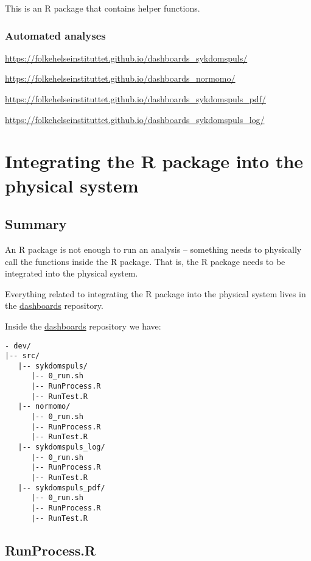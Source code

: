 \documentclass[12pt,]{article}
\begin{document}
This is an R package that contains helper functions.

\subsubsection{Automated analyses}\label{automated-analyses}

\url{https://folkehelseinstituttet.github.io/dashboards_sykdomspuls/}

\url{https://folkehelseinstituttet.github.io/dashboards_normomo/}

\url{https://folkehelseinstituttet.github.io/dashboards_sykdomspuls_pdf/}

\url{https://folkehelseinstituttet.github.io/dashboards_sykdomspuls_log/}

\section{Integrating the R package into the physical
system}\label{integrating-the-r-package-into-the-physical-system}

\subsection{Summary}\label{summary}

An R package is not enough to run an analysis -- something needs to
physically call the functions inside the R package. That is, the R
package needs to be integrated into the physical system.

Everything related to integrating the R package into the physical system
lives in the
\href{https://github.com/folkehelseinstituttet/dashboards/}{dashboards}
repository.

Inside the
\href{https://github.com/folkehelseinstituttet/dashboards/}{dashboards}
repository we have:

\begin{verbatim}
- dev/
|-- src/
   |-- sykdomspuls/
      |-- 0_run.sh
      |-- RunProcess.R
      |-- RunTest.R
   |-- normomo/
      |-- 0_run.sh
      |-- RunProcess.R
      |-- RunTest.R
   |-- sykdomspuls_log/
      |-- 0_run.sh
      |-- RunProcess.R
      |-- RunTest.R
   |-- sykdomspuls_pdf/
      |-- 0_run.sh
      |-- RunProcess.R
      |-- RunTest.R
\end{verbatim}

\subsection{RunProcess.R}\label{runprocess.r}
\end{document}
